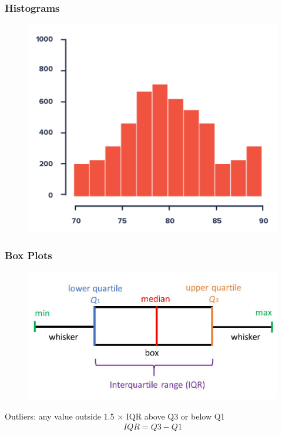 \documentclass[12pt]{article}
\numberwithin{equation}{section}
\begin{document}
\subsubsection{Histograms}
\begin{figure}[!ht]
    \centering
    \includegraphics[width=0.6\linewidth]{figures and tables/histogram.png}
\end{figure}

\subsubsection{Box Plots}
\begin{figure}[!ht]
    \centering
    \includegraphics[width=0.8\linewidth]{figures and tables/boxplot.jpg}
\end{figure}
Outliers: any value outside 1.5 $\times$ IQR above Q3 or below Q1
\begin{align}
    IQR = Q3 - Q1
\end{align}
\end{document}
